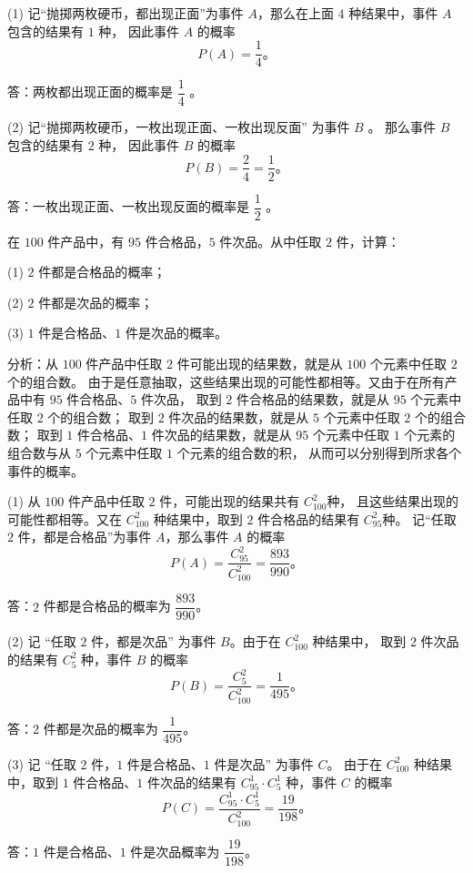 (1) 记“抛掷两枚硬币，都出现正面”为事件 $A$，那么在上面 $4$ 种结果中，事件 $A$ 包含的结果有 $1$ 种，
因此事件 $A$ 的概率
$$ P(A) = \dfrac{1}{4} \text{。} $$

答：两枚都出现正面的概率是 $\dfrac{1}{4}$ 。

(2) 记“抛掷两枚硬币，一枚出现正面、一枚出现反面” 为事件 $B$ 。
那么事件 $B$ 包含的结果有 $2$ 种， 因此事件 $B$ 的概率
$$ P(B) = \dfrac{2}{4} = \dfrac{1}{2} \text{。} $$

答：一枚出现正面、一枚出现反面的概率是 $\dfrac{1}{2}$ 。


\liti 在 $100$ 件产品中，有 $95$ 件合格品，$5$ 件次品。从中任取 $2$ 件，计算：

(1) $2$ 件都是合格品的概率；

(2) $2$ 件都是次品的概率；

(3) $1$ 件是合格品、$1$ 件是次品的概率。

分析：从 $100$ 件产品中任取 $2$ 件可能出现的结果数，就是从 $100$ 个元素中任取 $2$ 个的组合数。
由于是任意抽取，这些结果出现的可能性都相等。又由于在所有产品中有 $95$ 件合格品、$5$ 件次品，
取到 $2$ 件合格品的结果数，就是从 $95$ 个元素中任取 $2$ 个的组合数；
取到 $2$ 件次品的结果数，就是从 $5$ 个元素中任取 $2$ 个的组合数；
取到 $1$ 件合格品、$1$ 件次品的结果数，就是从 $95$ 个元素中任取 $1$ 个元素的组合数与从 $5$ 个元素中任取 $1$ 个元素的组合数的积，
从而可以分别得到所求各个事件的概率。

\jie (1)  从 $100$ 件产品中任取 $2$ 件，可能出现的结果共有 $C_{100}^2$种，
且这些结果出现的可能性都相等。又在 $C_{100}^2$ 种结果中，取到 $2$ 件合格品的结果有 $C_{95}^2 $种。
记“任取 $2$ 件，都是合格品”为事件 $A$，那么事件 $A$ 的概率
$$ P(A) = \dfrac{C_{95}^2}{C_{100}^2} = \dfrac{893}{990} \text{。} $$

答：$2$ 件都是合格品的概率为 $\dfrac{893}{990}$。


(2) 记 “任取 $2$ 件，都是次品” 为事件 $B$。由于在 $C_{100}^2$ 种结果中，
取到 $2$ 件次品的结果有 $C_5^2$ 种，事件 $B$ 的概率
$$ P(B) = \dfrac{C_5^2}{C_{100}^2} = \dfrac{1}{495} \text{。} $$

答：$2$ 件都是次品的概率为 $\dfrac{1}{495}$。


(3) 记 “任取 $2$ 件，$1$ 件是合格品、$1$ 件是次品” 为事件 $C$。
由于在 $C_{100}^2$ 种结果中，取到 $1$ 件合格品、$1$ 件次品的结果有
$C_{95}^1 \cdot C_5^1$ 种，事件 $C$ 的概率
$$ P(C) = \dfrac{C_{95}^1 \cdot C_5^1}{C_{100}^2} = \dfrac{19}{198} \text{。} $$

答：$1$ 件是合格品、$1$ 件是次品概率为 $\dfrac{19}{198}$。



